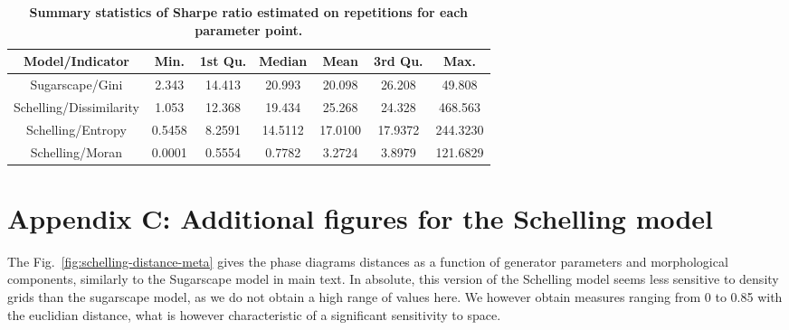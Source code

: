 \documentclass{JASSS}
\begin{document}
\begin{table}[!t]
\centering
	\begin{tabular}{|c|cccccc|}
	\hline
Model/Indicator & Min. & 1st Qu. &  Median &  Mean & 3rd Qu. & Max. \\\hline
Sugarscape/Gini & 2.343 & 14.413 & 20.993 & 20.098 & 26.208 & 49.808\\\hline 
Schelling/Dissimilarity & 1.053 & 12.368 & 19.434 & 25.268 & 24.328 & 468.563\\
Schelling/Entropy & 0.5458 & 8.2591 & 14.5112 & 17.0100 & 17.9372 & 244.3230\\
Schelling/Moran & 0.0001 & 0.5554 & 0.7782 & 3.2724 & 3.8979 & 121.6829\\\hline
    \end{tabular}
    \caption{\textbf{Summary statistics of Sharpe ratio estimated on repetitions for each parameter point.}}
\label{tab:summarysharpes}
\end{table}



\section{Appendix C: Additional figures for the Schelling model}

The Fig.~\ref{fig:schelling-distance-meta} gives the phase diagrams distances as a function of generator parameters and morphological components, similarly to the Sugarscape model in main text. In absolute, this version of the Schelling model seems less sensitive to density grids than the sugarscape model, as we do not obtain a high range of values here. We however obtain measures ranging from 0 to 0.85 with the euclidian distance, what is however characteristic of a significant sensitivity to space.

\end{document}
